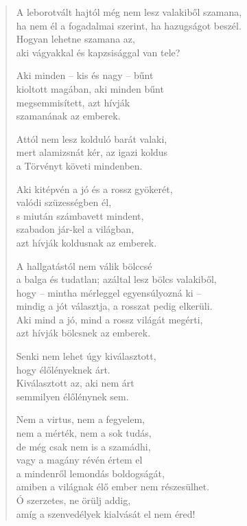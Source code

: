 \begin{verse}
 A leborotvált hajtól még nem lesz valakiből szamana,\\
ha nem él a fogadalmai szerint, ha hazugságot beszél.\\
Hogyan lehetne szamana az,\\
aki vágyakkal és kapzsisággal van tele?

 Aki minden – kis és nagy – bűnt\\
kioltott magában, aki minden bűnt\\
megsemmisített, azt hívják\\
szamanának az emberek.

 Attól nem lesz kolduló barát valaki,\\
mert alamizsnát kér, az igazi koldus\\
a Törvényt követi mindenben.

 Aki kitépvén a jó és a rossz gyökerét,\\
valódi szüzességben él,\\
s miután számbavett mindent,\\
szabadon jár-kel a világban,\\
azt hívják koldusnak az emberek.

 A hallgatástól nem válik bölccsé\\
a balga és tudatlan; azáltal lesz bölcs valakiből,\\
hogy – mintha mérleggel egyensúlyozná ki –\\
mindig a jót választja, a rosszat pedig elkerüli.\\
Aki mind a jó, mind a rossz világát megérti,\\
azt hívják bölcsnek az emberek.

 Senki nem lehet úgy kiválasztott,\\
hogy élőlényeknek árt.\\
Kiválasztott az, aki nem árt\\
semmilyen élőlénynek sem.

\newpage

 Nem a virtus, nem a fegyelem,\\
nem a mérték, nem a sok tudás,\\
de még csak nem is a szamádhi,\\
vagy a magány révén értem el\\
a mindenről lemondás boldogságát,\\
amiben a világnak élő ember nem részesülhet.\\
Ó szerzetes, ne örülj addig,\\
amíg a szenvedélyek kialvását el nem éred!

\end{verse}
